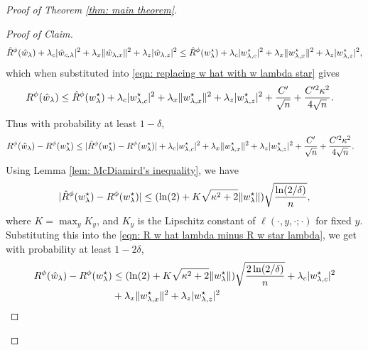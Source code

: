 \begin{proof}[Proof of Theorem \ref{thm: main theorem}]
\begin{proof}[Proof of Claim]
\begin{equation*}
\begin{aligned}
                \hat{R}^\phi(\hat{w}_\lambda) +
                \lambda_c|\hat{w}_{c,\lambda}|^2+
                \lambda_x\|\hat{w}_{\lambda,x}\|^2 +
                \lambda_z|\hat{w}_{\lambda,z}|^2 \leq
                \hat{R}^\phi(w^\star_{\lambda}) +
                \lambda_c|w^\star_{{\lambda,c}}|^2 +
                \lambda_x\|w^\star_{{\lambda,x}}\|^2 +
                \lambda_z|w^\star_{{\lambda,z}}|^2,
            \end{aligned}
        \end{equation*}
        which when substituted into \eqref{eqn: replacing w hat with w lambda star} gives
        \begin{equation*}
            \begin{aligned}
                 R^\phi(\hat{w}_\lambda) &\leq
                 \hat{R}^\phi(w^\star_{\lambda}) +
                 \lambda_c|w^\star_{{\lambda,c}}|^2 +
                 \lambda_x\|w^\star_{{\lambda,x}}\|^2 +
                 \lambda_z|w^\star_{{\lambda,z}}|^2 +  \frac{C'}{\sqrt{n}} +
                 \frac{C'^2\kappa^2}{4\sqrt{n}}.
            \end{aligned}
        \end{equation*}
        Thus with probability at least $1-\delta$,
        \begin{equation}\label{eqn: R w hat lambda minus R w star lambda}
            \begin{aligned}
                R^\phi(\hat{w}_\lambda) - R^\phi(w^\star_{\lambda}) &\leq |\hat{R}^\phi(w^\star_{\lambda}) - R^\phi(w^\star_{\lambda})| +
                \lambda_c|w^\star_{{\lambda,c}}|^2 +\lambda_x\|w^\star_{{\lambda,x}}\|^2
                +\lambda_z|w^\star_{{\lambda,z}}|^2 +  \frac{C'}{\sqrt{n}} +\frac{C'^2\kappa^2}{4\sqrt{n}}.
            \end{aligned}
        \end{equation}
        Using Lemma \ref{lem: McDiamird's inequality}, we have
        \begin{equation*}
            |\hat{R}^\phi(w^\star_{\lambda}) - R^\phi(w^\star_{\lambda})| \leq (\ln(2) + K\sqrt{\kappa^2+2}\|w^\star_{\lambda}\|)\sqrt{\frac{\ln(2/\delta)}{n}},
        \end{equation*}
        where $K = \max_y K_y$, and $K_y$ is the Lipschitz constant of $\ell(\cdot, y, \cdot; \cdot)$ for fixed $y$.
        Substituting this into the \eqref{eqn: R w hat lambda minus R w star lambda}, we get with probability at least $1-2\delta$,
        \begin{equation}\label{eqn: imputed risk of whl - imputed risk of wsl}
            \begin{aligned}
                R^\phi(\whl) - R^\phi(\wsl) &\leq (\ln(2) + K\sqrt{\kappa^2+2}\|\wsl\|)\sqrt{\frac{2\ln(2/\delta)}{n}} +
                \lambda_c|\wslc|^2 \\
                &+
                \lambda_x\|\wslx\|^2 + \lambda_z|\wslz|^2

\end{aligned}
\end{equation}
\end{proof}
\end{proof}
